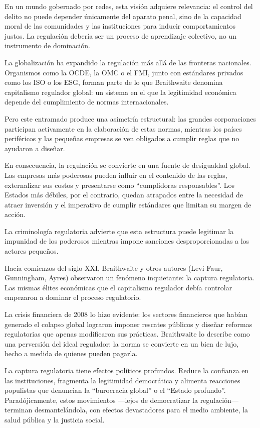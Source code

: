\documentclass[
  spanish,
  letterpaper,
  DIV=11,
  numbers=noendperiod]{scrreprt}
\begin{document}
En un mundo gobernado por redes, esta visión adquiere relevancia: el
control del delito no puede depender únicamente del aparato penal, sino
de la capacidad moral de las comunidades y las instituciones para
inducir comportamientos justos. La regulación debería ser un proceso de
aprendizaje colectivo, no un instrumento de dominación.

La globalización ha expandido la regulación más allá de las fronteras
nacionales. Organismos como la OCDE, la OMC o el FMI, junto con
estándares privados como los ISO o los ESG, forman parte de lo que
Braithwaite denomina capitalismo regulador global: un sistema en el que
la legitimidad económica depende del cumplimiento de normas
internacionales.

Pero este entramado produce una asimetría estructural: las grandes
corporaciones participan activamente en la elaboración de estas normas,
mientras los países periféricos y las pequeñas empresas se ven obligados
a cumplir reglas que no ayudaron a diseñar.

En consecuencia, la regulación se convierte en una fuente de desigualdad
global. Las empresas más poderosas pueden influir en el contenido de las
reglas, externalizar sus costos y presentarse como ``cumplidoras
responsables''. Los Estados más débiles, por el contrario, quedan
atrapados entre la necesidad de atraer inversión y el imperativo de
cumplir estándares que limitan su margen de acción.

La criminología regulatoria advierte que esta estructura puede legitimar
la impunidad de los poderosos mientras impone sanciones
desproporcionadas a los actores pequeños.

Hacia comienzos del siglo XXI, Braithwaite y otros autores (Levi-Faur,
Gunningham, Ayres) observaron un fenómeno inquietante: la captura
regulatoria. Las mismas élites económicas que el capitalismo regulador
debía controlar empezaron a dominar el proceso regulatorio.

La crisis financiera de 2008 lo hizo evidente: los sectores financieros
que habían generado el colapso global lograron imponer rescates públicos
y diseñar reformas regulatorias que apenas modificaron sus prácticas.
Braithwaite lo describe como una perversión del ideal regulador: la
norma se convierte en un bien de lujo, hecho a medida de quienes pueden
pagarla.

La captura regulatoria tiene efectos políticos profundos. Reduce la
confianza en las instituciones, fragmenta la legitimidad democrática y
alimenta reacciones populistas que denuncian la ``burocracia global'' o
el ``Estado profundo''. Paradójicamente, estos movimientos ---lejos de
democratizar la regulación--- terminan desmantelándola, con efectos
devastadores para el medio ambiente, la salud pública y la justicia
social.
\end{document}
